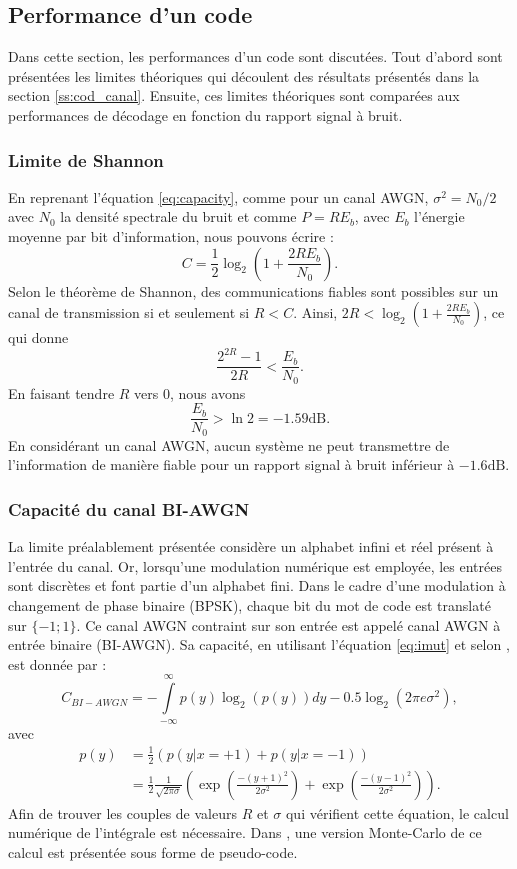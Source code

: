 \subsection{Performance d'un code}
Dans cette section, les performances d'un code sont discutées. Tout d'abord sont présentées les limites théoriques qui 
découlent des résultats présentés dans la section \ref{ss:cod_canal}. Ensuite, ces limites théoriques sont comparées aux 
performances de décodage en fonction du rapport signal à bruit.
\subsubsection{Limite de Shannon}
En reprenant l'équation \ref{eq:capacity}, comme pour un canal AWGN, $\sigma^2 = N_0/2$ avec $N_0$ la densité spectrale du bruit et comme 
$P=R E_b$, avec $E_b$ l'énergie moyenne par bit d'information, nous pouvons écrire :
\[C=\frac{1}{2}\log_2(1+\frac{2RE_b}{N_0}).\]
Selon le théorème de Shannon, des communications fiables sont possibles sur un canal de transmission si et seulement si $R < C$. Ainsi,
$2R < \log_2\left(1+\frac{2RE_b}{N_0}\right)$, ce qui donne 
\begin{equation}\label{eq:shlimit}
	\frac{2^{2R}-1}{2R}<\frac{E_b}{N_0}.
\end{equation}
En faisant tendre $R$ vers $0$, nous avons \[\frac{E_b}{N_0}>\ln 2 = -1.59 \text{dB}.\]
En considérant un canal AWGN, aucun système ne peut transmettre de l'information de manière fiable pour un rapport 
signal à bruit inférieur à $-1.6\text{dB}.$

\subsubsection{Capacité du canal BI-AWGN}
La limite préalablement présentée considère un alphabet infini et réel présent à l'entrée du canal. Or, lorsqu'une 
modulation numérique est employée, les entrées sont discrètes et font partie d'un alphabet fini. Dans le cadre d'une 
modulation à changement de phase binaire (BPSK), chaque bit du mot de code est translaté sur $\{-1;1\}$. Ce canal AWGN 
contraint sur son entrée est appelé canal AWGN à entrée binaire (BI-AWGN). Sa capacité, en utilisant l'équation 
\ref{eq:imut} et selon \cite[Chapitre 8]{ryan}, est donnée par : 
\begin{equation}\label{eq:softlimit}
	C_{BI-AWGN} = - \int\limits_{-\infty}^{\infty} p(y) \log_2\left(p(y)\right)dy - 0.5\log_2\left(2\pi e \sigma^2\right),
\end{equation}
avec 
\begin{align*}
	p(y) & = \frac{1}{2} \left(p(y|x=+1)+p(y|x=-1)\right)                                                    \\
	     & = \frac{1}{2} \frac{1}{\sqrt{2\pi \sigma}} \left( \exp \left(\frac{-(y+1)^2}{2\sigma ^2}\right) + 
	\exp \left(\frac{-(y-1)^2}{2\sigma ^2}\right)\right).
\end{align*}
Afin de trouver les couples de valeurs $R$ et $\sigma$ qui vérifient cette équation, le calcul numérique de l'intégrale 
est nécessaire. Dans \cite{johnson2009iterative}, une version Monte-Carlo de ce calcul est présentée sous forme de pseudo-code.

